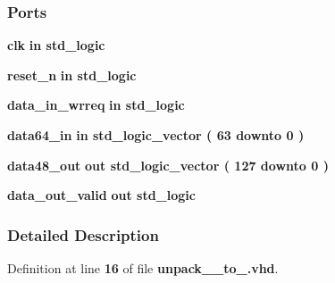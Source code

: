 \subsubsection*{Ports}
 \begin{DoxyCompactItemize}
\item 
{\bf clk}  {\bfseries {\bfseries \textcolor{keywordflow}{in}\textcolor{vhdlchar}{ }}} {\bfseries \textcolor{comment}{std\+\_\+logic}\textcolor{vhdlchar}{ }} 
\item 
{\bf reset\+\_\+n}  {\bfseries {\bfseries \textcolor{keywordflow}{in}\textcolor{vhdlchar}{ }}} {\bfseries \textcolor{comment}{std\+\_\+logic}\textcolor{vhdlchar}{ }} 
\item 
{\bf data\+\_\+in\+\_\+wrreq}  {\bfseries {\bfseries \textcolor{keywordflow}{in}\textcolor{vhdlchar}{ }}} {\bfseries \textcolor{comment}{std\+\_\+logic}\textcolor{vhdlchar}{ }} 
\item 
{\bf data64\+\_\+in}  {\bfseries {\bfseries \textcolor{keywordflow}{in}\textcolor{vhdlchar}{ }}} {\bfseries \textcolor{comment}{std\+\_\+logic\+\_\+vector}\textcolor{vhdlchar}{ }\textcolor{vhdlchar}{(}\textcolor{vhdlchar}{ }\textcolor{vhdlchar}{ } \textcolor{vhdldigit}{63} \textcolor{vhdlchar}{ }\textcolor{keywordflow}{downto}\textcolor{vhdlchar}{ }\textcolor{vhdlchar}{ } \textcolor{vhdldigit}{0} \textcolor{vhdlchar}{ }\textcolor{vhdlchar}{)}\textcolor{vhdlchar}{ }} 
\item 
{\bf data48\+\_\+out}  {\bfseries {\bfseries \textcolor{keywordflow}{out}\textcolor{vhdlchar}{ }}} {\bfseries \textcolor{comment}{std\+\_\+logic\+\_\+vector}\textcolor{vhdlchar}{ }\textcolor{vhdlchar}{(}\textcolor{vhdlchar}{ }\textcolor{vhdlchar}{ } \textcolor{vhdldigit}{127} \textcolor{vhdlchar}{ }\textcolor{keywordflow}{downto}\textcolor{vhdlchar}{ }\textcolor{vhdlchar}{ } \textcolor{vhdldigit}{0} \textcolor{vhdlchar}{ }\textcolor{vhdlchar}{)}\textcolor{vhdlchar}{ }} 
\item 
{\bf data\+\_\+out\+\_\+valid}  {\bfseries {\bfseries \textcolor{keywordflow}{out}\textcolor{vhdlchar}{ }}} {\bfseries \textcolor{comment}{std\+\_\+logic}\textcolor{vhdlchar}{ }} 
\end{DoxyCompactItemize}


\subsubsection{Detailed Description}


Definition at line {\bf 16} of file {\bf unpack\+\_\+\_\+to\+\_.\+vhd}.



